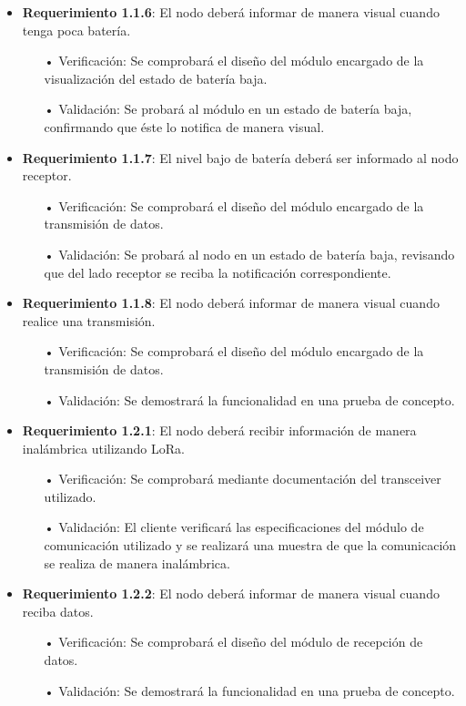 \documentclass[11pt]{charter}
\begin{document}
\begin{itemize}
\item \textbf{Requerimiento 1.1.6}: El nodo deberá informar de manera visual cuando tenga poca batería.
\begin{itemize}
\item[•] Verificación: Se comprobará el diseño del módulo encargado de la visualización del estado de batería baja.
\item[•] Validación: Se probará al módulo en un estado de batería baja, confirmando que éste lo notifica de manera visual.
\end{itemize}

\item \textbf{Requerimiento 1.1.7}: El nivel bajo de batería deberá ser informado al nodo receptor.
\begin{itemize}
\item[•] Verificación: Se comprobará el diseño del módulo encargado de la transmisión de datos.
\item[•] Validación: Se probará al nodo en un estado de batería baja, revisando que del lado receptor se reciba la notificación correspondiente.
\end{itemize}

\item \textbf{Requerimiento 1.1.8}: El nodo deberá informar de manera visual cuando realice una transmisión.
\begin{itemize}
\item[•] Verificación: Se comprobará el diseño del módulo encargado de la transmisión de datos.
\item[•] Validación: Se demostrará la funcionalidad en una prueba de concepto.
\end{itemize}

\item \textbf{Requerimiento 1.2.1}: El nodo deberá recibir información de manera inalámbrica utilizando LoRa.
\begin{itemize}
\item[•] Verificación: Se comprobará mediante documentación del transceiver utilizado.
\item[•] Validación: El cliente verificará las especificaciones del módulo de comunicación utilizado y se realizará una muestra de que la comunicación se realiza de manera inalámbrica.
\end{itemize}

\item \textbf{Requerimiento 1.2.2}: El nodo deberá informar de manera visual cuando reciba datos.
\begin{itemize}
\item[•] Verificación: Se comprobará el diseño del módulo de recepción de datos.
\item[•] Validación: Se demostrará la funcionalidad en una prueba de concepto.
\end{itemize}


\end{itemize}
\end{document}
